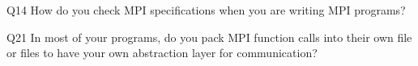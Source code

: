 \begin{description}%
\item{Q14} How do you check MPI specifications when you are writing MPI programs?%
\item{Q21} In most of your programs, do you pack MPI function calls into their own file or files to have your own abstraction layer for communication?%
\end{description}%
